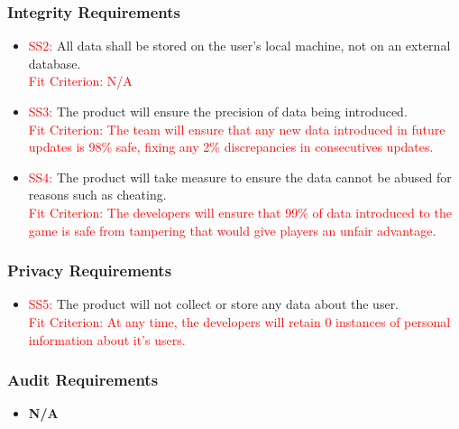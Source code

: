 \documentclass[12pt, titlepage]{article}
\begin{document}
\subsubsection{Integrity Requirements}
\begin{itemize}
    \item \textcolor{red}{SS2: }All data shall be stored on the user's local machine, not on an external database.\\
    \textcolor{red}{Fit Criterion: N/A}
    \item \textcolor{red}{SS3: }The product will ensure the precision of data being introduced.\\
    \textcolor{red}{Fit Criterion: The team will ensure that any new data introduced in future updates is 98\% safe, fixing any 2\% discrepancies in consecutives updates.}
    \item \textcolor{red}{SS4: }The product will take measure to ensure the data cannot be abused for reasons such as cheating.\\
    \textcolor{red}{Fit Criterion: The developers will ensure that 99\% of data introduced to the game is safe from tampering that would give players an unfair advantage.}
\end{itemize}

\subsubsection{Privacy Requirements}
\begin{itemize}
    \item \textcolor{red}{SS5: }The product will not collect or store any data about the user.\\
    \textcolor{red}{Fit Criterion: At any time, the developers will retain 0 instances of personal information about it's users.}
\end{itemize}

\subsubsection{Audit Requirements}
\begin{itemize}
    \item \textbf{N/A}
\end{itemize}
\end{document}
